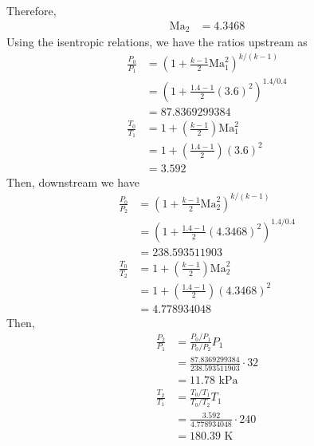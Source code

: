 Therefore,
\begin{align*}
    \text{Ma}_2 &= \boxed{4.3468}
\end{align*}
Using the isentropic relations, we have the ratios upstream as
\begin{align*}
    \frac{P_0}{P_1} &= \left(1 + \frac{k - 1}{2} \text{Ma}_1^2 \right)^{k/(k-1)} \\
    &= \left(1 + \frac{1.4 - 1}{2} (3.6)^2 \right)^{1.4/0.4} \\
    &= 87.8369299384 \\
    \frac{T_0}{T_1} &= 1 + \left( \frac{k - 1}{2} \right) \text{Ma}_1^2 \\
    &= 1 + \left( \frac{1.4 - 1}{2} \right) (3.6)^2 \\
    &= 3.592
\end{align*}
Then, downstream we have
\begin{align*}
    \frac{P_0}{P_2} &= \left(1 + \frac{k - 1}{2} \text{Ma}_2^2 \right)^{k/(k-1)} \\
    &= \left(1 + \frac{1.4 - 1}{2} (4.3468)^2 \right)^{1.4/0.4} \\
    &= 238.593511903 \\
    \frac{T_0}{T_2} &= 1 + \left( \frac{k - 1}{2} \right) \text{Ma}_2^2 \\
    &= 1 + \left( \frac{1.4 - 1}{2} \right) (4.3468)^2 \\
    &= 4.778934048
\end{align*}
Then,
\begin{align*}
    \frac{P_2}{P_1} &= \frac{P_0 / P_1}{P_0 / P_2} P_1 \\
    &= \frac{87.8369299384}{238.593511903} \cdot 32 \\
    &= \boxed{11.78 \text{ kPa}} \\
    \frac{T_2}{T_1} &= \frac{T_0 / T_1}{T_0 / T_2} T_1 \\
    &= \frac{3.592}{4.778934048} \cdot 240 \\
    &= \boxed{180.39 \text{ K}}
\end{align*}

